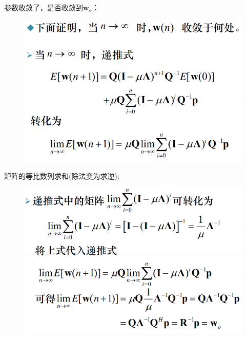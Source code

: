 \documentclass[UTF8]{ctexart} %
\begin{document}
			参数收敛了，是否收敛到$\textbf{w}_o$：
			\begin{figure}[H]
				\centering\includegraphics[scale=0.4]{32.png}
			\end{figure}
			矩阵的等比数列求和(除法变为求逆):
			\begin{figure}[H]
				\centering\includegraphics[scale=0.4]{33.png}
			\end{figure}
			
				
	
	
	
	
	
	
	
	
		
\end{document}
